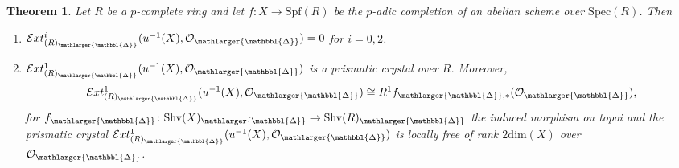 \documentclass{amsart}
\newcommand{\prism}{{\mathlarger{\mathbbl{\Delta}}}}
\theoremstyle{plain}
\newtheorem{theorem}{Theorem}[subsection]
\theoremstyle{definition}
\newcommand{\Spec}{\mathrm{Spec}}
\newcommand{\Spf}{\mathrm{Spf}}
\newcommand{\red}[1]{{\color{black} #1}}
\begin{document}
\begin{theorem}
  \label{sec:prism-dieud-cryst-ext-for-abelian-schemes}
  Let $R$ be a $p$-complete ring and let $f\colon X\to \Spf(R)$ be the $p$-adic completion of an abelian scheme over $\Spec(R)$. Then
  \begin{enumerate}
   \item $\mathcal{E}xt_{(R)_{\prism}}^i(u^{-1}(X),\mathcal{O}_\prism)=0$ for $i=0,2$.
   \item $\mathcal{E}xt_{(R)_{\prism}}^1(u^{-1}(X),\mathcal{O}_\prism)$ is a prismatic crystal over $R$. Moreover, $$\mathcal{E}xt_{(R)_{\prism}}^1(u^{-1}(X),\mathcal{O}_\prism)\cong R^1f_{\prism,\ast}(\mathcal{O}_\prism),$$ for $f_\prism\colon \mathrm{Shv}(X)_\prism\to \mathrm{Shv}(R)_\prism$ the induced morphism on topoi and the prismatic crystal $\mathcal{E}xt_{(R)_{\prism}}^1(u^{-1}(X),\mathcal{O}_\prism)$ is locally free of rank $2\mathrm{dim}(X)$ over \red{$\mathcal{O}_{\prism}$}.
   \end{enumerate}
 \end{theorem}
\end{document}
